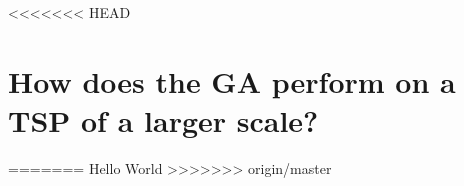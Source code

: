 <<<<<<< HEAD
\chapter{How does the GA perform on a TSP of a larger scale?}
=======
Hello World
>>>>>>> origin/master
